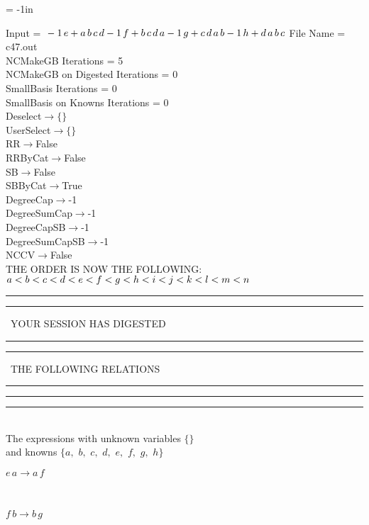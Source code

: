 \voffset = -1in
\evensidemargin 0.1in
\oddsidemargin 0.1in
\textheight 9in
\textwidth 6in

\normalsize
\baselineskip=12pt
\noindent
Input = 
$
\\-1\,
 e + a\,
 b\,
 c\,
 d\\
-1\,
 f + b\,
 c\,
 d\,
 a\\
-1\,
 g + c\,
 d\,
 a\,
 b\\
-1\,
 h + d\,
 a\,
 b\,
 c\\
$
File Name = c47.out\\
NCMakeGB Iterations = 5\\
NCMakeGB on Digested Iterations = 0\\
SmallBasis Iterations = 0\\
SmallBasis on Knowns Iterations = 0\\
Deselect$\rightarrow \{\}$\\
UserSelect$\rightarrow \{\}$\\
RR$\rightarrow $False\\
RRByCat$\rightarrow $False\\
SB$\rightarrow $False\\
SBByCat$\rightarrow $True\\
DegreeCap$\rightarrow $-1\\
DegreeSumCap$\rightarrow $-1\\
DegreeCapSB$\rightarrow $-1\\
DegreeSumCapSB$\rightarrow $-1\\
NCCV$\rightarrow $False\\
THE ORDER IS NOW THE FOLLOWING:\hfil\break
$
a<b<c<d<e<f<g<h<i<j<k<l<m<n\\
$
\rule[2pt]{6in}{4pt}\hfil\break
\rule[2pt]{1.879in}{4pt}
\ YOUR SESSION HAS DIGESTED\ 
\rule[2pt]{1.879in}{4pt}\hfil\break
\rule[2pt]{1.923in}{4pt}
\ THE FOLLOWING RELATIONS\ 
\rule[2pt]{1.923in}{4pt}\hfil\break
\rule[2pt]{6in}{4pt}\hfil\break
\rule[3pt]{6in}{.7pt}\\
The expressions with unknown variables $\{\}$\\
and knowns $\{a,
$ $
b,
$ $
c,
$ $
d,
$ $
e,
$ $
f,
$ $
g,
$ $
h\}$\smallskip\\
\begin{minipage}{6in}
$
e\,
 a\rightarrow a\,
 f
$
\end{minipage}\medskip \\
\begin{minipage}{6in}
$
f\,
 b\rightarrow b\,
 g
$
\end{minipage}\medskip \\
